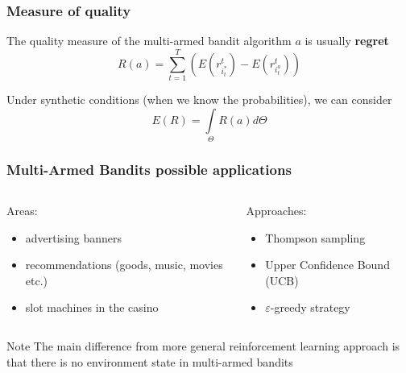 \documentclass[fullscreen=true, bookmarks=true, hyperref={pdfencoding=unicode}]{beamer}
\begin{document}

\begin{frame}
  \frametitle{Measure of quality}

  \pause
  The quality measure of the multi-armed bandit algorithm $a$ is usually {\bf regret} $$ R(a) = \sum\limits_{t=1}^T \left(E(r_{i^*_t}^t) - E (r_{i^a_t}^t)\right)$$

  \vspace{1cm}
  Under synthetic conditions (when we know the probabilities), we can consider $$ E\left( R \right) = \int\limits_{\Theta} R(a)d\Theta$$
\end{frame}


\begin{frame}
   \frametitle{Multi-Armed Bandits possible applications}

   \begin{columns}
     \begin{column}{.4\paperwidth}
     Areas:
       \begin{itemize}
         \item advertising banners
         \item recommendations (goods, music, movies etc.)
         \item slot machines in the casino
       \end{itemize}
     \end{column}
     \begin{column}{.4\paperwidth}
       Approaches:
       \begin{itemize}
         \item Thompson sampling
         \item Upper Confidence Bound (UCB)
         \item $\varepsilon$-greedy strategy
       \end{itemize}
     \end{column}
   \end{columns}

   \vspace{1cm}
   \begin{block}{Note}
     The main difference from more general reinforcement learning approach is that there is no environment state in multi-armed bandits
   \end{block}
\end{frame}

\end{document}
